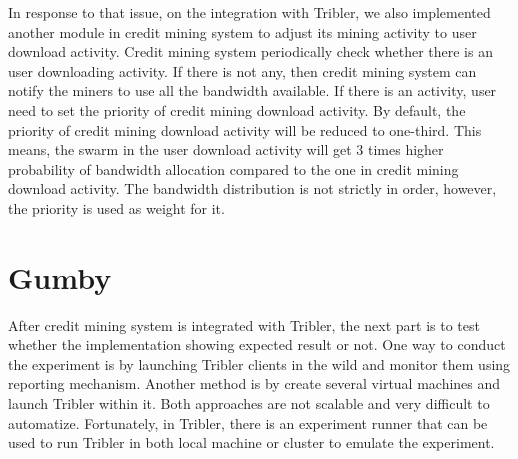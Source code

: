 In response to that issue, on the integration with Tribler, we also implemented another module in credit mining system to adjust its mining activity to user download activity. Credit mining system periodically check whether there is an user downloading activity. If there is not any, then credit mining system can notify the miners to use all the bandwidth available. If there is an activity, user need to set the priority of credit mining download activity. By default, the priority of credit mining download activity will be reduced to one-third. This means, the swarm in the user download activity will get 3 times higher probability of bandwidth allocation compared to the one in credit mining download activity. The bandwidth distribution is not strictly in order, however, the priority is used as weight for it.




\section{Gumby}
\label{section:gumby}
After credit mining system is integrated with Tribler, the next part is to test whether the implementation showing expected result or not. One way to conduct the experiment is by launching Tribler clients in the wild and monitor them using reporting mechanism. Another method is by create several virtual machines and launch Tribler within it. Both approaches are not scalable and very difficult to automatize. Fortunately, in Tribler, there is an experiment runner that can be used to run Tribler in both local machine or cluster to emulate the experiment.

